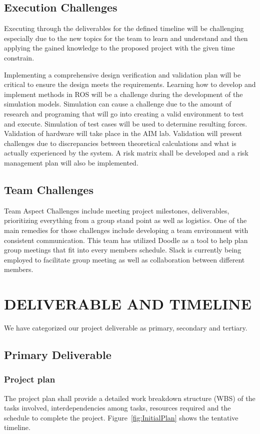 \documentclass[10pt,journal,compsoc]{IEEEtran}
\begin{document}
\subsection{Execution Challenges}
Executing through the deliverables for the defined timeline will be challenging especially due to the new topics for the team to learn and understand and then applying the gained knowledge to the proposed project with the given time constrain.

Implementing a comprehensive design verification and validation plan will be critical to ensure the design meets the requirements. Learning how to develop and implement methods in ROS will be a challenge during the development of the simulation models. Simulation can cause a challenge due to the amount of research and programing that will go into creating a valid environment to test and execute. Simulation of test cases will be used to determine resulting forces. 
Validation of hardware will take place in the AIM lab. Validation will present challenges due to discrepancies between theoretical calculations and what is actually experienced by the system. A risk matrix shall be developed and a risk management plan will also be implemented.

\subsection{Team Challenges}
Team Aspect Challenges include meeting project milestones, deliverables, prioritizing everything from a group stand point as well as logistics. One of the main remedies for those challenges include developing a team environment with consistent communication. This team has utilized Doodle as a tool to help plan group meetings that fit into every member\textquotesingle s schedule. Slack is currently being employed to facilitate group meeting as well as collaboration between different members. 

\section{DELIVERABLE AND TIMELINE}
We have categorized our project deliverable as primary, secondary and tertiary.

\subsection{Primary Deliverable}

\subsubsection{Project plan}
The project plan shall provide a detailed work breakdown structure (WBS) of the tasks involved, interdependencies among tasks, resources required and the schedule to complete the project. Figure~\ref{fig:InitialPlan} shows the tentative timeline.
\end{document}
